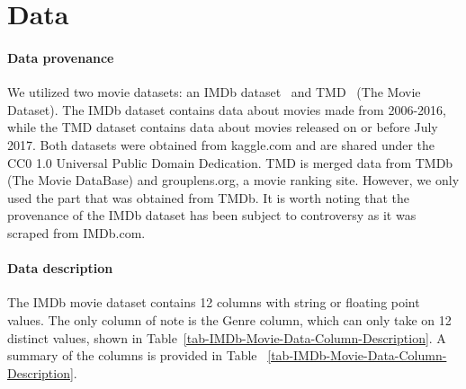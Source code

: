 \section{Data}
    \begin{multicols}{2}
        \paragraph{Data provenance}
            We utilized two movie datasets: an IMDb dataset~\cite{data:IMDb} and
                TMD~\cite{data:TMD} (The Movie Dataset).
            The IMDb dataset contains data about movies made from 2006-2016, while the TMD
                dataset contains data about movies released on or before July 2017.
            Both datasets were obtained from kaggle.com and are shared under the CC0 1.0
                Universal Public Domain Dedication.
            TMD is merged data from TMDb (The Movie DataBase) and grouplens.org, a movie
                ranking site.
            However, we only used the part that was obtained from TMDb.
            It is worth noting that the provenance of the IMDb dataset has been subject to
                controversy as it was scraped from IMDb.com.

        \paragraph{Data description}
            The IMDb movie dataset contains 12 columns with string or floating point
                values.
            The only column of note is the Genre column, which can only take on 12 distinct
                values, shown in Table~\ref{tab-IMDb-Movie-Data-Column-Description}.
            A summary of the columns is provided in Table
                ~\ref{tab-IMDb-Movie-Data-Column-Description}.
    \end{multicols}
